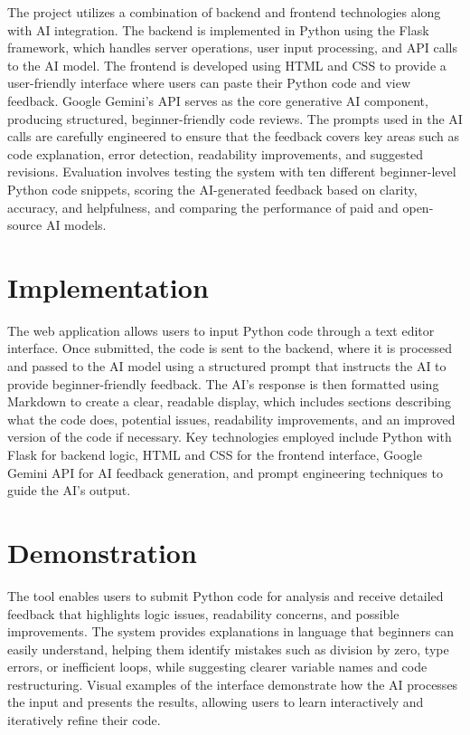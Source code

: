 \documentclass[12pt]{article}
\begin{document}
The project utilizes a combination of backend and frontend technologies along with AI integration. The backend is implemented in Python using the Flask framework, which handles server operations, user input processing, and API calls to the AI model. The frontend is developed using HTML and CSS to provide a user-friendly interface where users can paste their Python code and view feedback. Google Gemini's API serves as the core generative AI component, producing structured, beginner-friendly code reviews. The prompts used in the AI calls are carefully engineered to ensure that the feedback covers key areas such as code explanation, error detection, readability improvements, and suggested revisions. Evaluation involves testing the system with ten different beginner-level Python code snippets, scoring the AI-generated feedback based on clarity, accuracy, and helpfulness, and comparing the performance of paid and open-source AI models.

\section*{Implementation}

The web application allows users to input Python code through a text editor interface. Once submitted, the code is sent to the backend, where it is processed and passed to the AI model using a structured prompt that instructs the AI to provide beginner-friendly feedback. The AI's response is then formatted using Markdown to create a clear, readable display, which includes sections describing what the code does, potential issues, readability improvements, and an improved version of the code if necessary. Key technologies employed include Python with Flask for backend logic, HTML and CSS for the frontend interface, Google Gemini API for AI feedback generation, and prompt engineering techniques to guide the AI's output.



\section*{Demonstration}

The tool enables users to submit Python code for analysis and receive detailed feedback that highlights logic issues, readability concerns, and possible improvements. The system provides explanations in language that beginners can easily understand, helping them identify mistakes such as division by zero, type errors, or inefficient loops, while suggesting clearer variable names and code restructuring. Visual examples of the interface demonstrate how the AI processes the input and presents the results, allowing users to learn interactively and iteratively refine their code.
\end{document}
